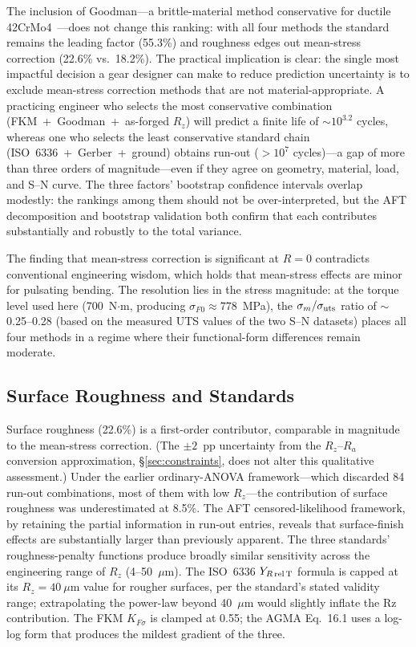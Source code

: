 \documentclass[twocolumn,12pt,a4paper]{article}
\begin{document}
The inclusion of Goodman---a brittle-material method conservative for
ductile 42CrMo4~\cite{stephens2001}---does not change this ranking:
with all four methods the standard remains the leading factor (55.3\%)
and roughness edges out mean-stress correction (22.6\% vs.\ 18.2\%).
The practical
implication is clear: the single most impactful decision a gear
designer can make
to reduce prediction uncertainty is to exclude mean-stress correction
methods that are not material-appropriate. A practicing engineer who selects the most conservative
combination
(FKM~+~Goodman~+~as-forged $R_z$) will predict a finite life of
$\sim$$10^{3.2}$ cycles, whereas one who selects the least
conservative standard chain (ISO~6336~+~Gerber~+~ground) obtains
run-out ($>10^7$ cycles)---a gap of more than three orders of
magnitude---even if they agree on geometry, material,
load, and S--N curve. The three factors' bootstrap confidence intervals
overlap modestly: the rankings among them should not be over-interpreted,
but the AFT decomposition and bootstrap validation both confirm that each
contributes substantially and robustly to the total variance.

The finding that mean-stress correction is significant at $R=0$
contradicts conventional engineering wisdom, which holds that
mean-stress effects are minor for pulsating bending. The resolution lies
in the stress magnitude: at the torque level used here (700~N$\cdot$m,
producing $\sigma_{F0} \approx 778$~MPa), the $\sigma_m/\sigma_{\rm uts}$
ratio of $\sim$0.25--0.28 (based on the measured UTS values of the two
S--N datasets) places all four methods in a regime where their
functional-form differences remain moderate.

\subsection{Surface Roughness and Standards}

Surface roughness (22.6\%) is a first-order contributor, comparable in
magnitude to the mean-stress correction. (The $\pm 2$~pp uncertainty
from the $R_z$--$R_a$ conversion approximation,
\S\ref{sec:constraints}, does not alter this qualitative assessment.)
Under the earlier ordinary-ANOVA
framework---which discarded 84 run-out combinations, most of them with
low $R_z$---the contribution of surface roughness was underestimated at
8.5\%. The AFT censored-likelihood framework, by retaining the partial
information in run-out entries, reveals that surface-finish effects are
substantially larger than previously apparent. The three standards'
roughness-penalty functions produce broadly similar sensitivity across
the engineering range of $R_z$ (4--50~$\mu$m). The ISO~6336
$Y_{R\,\rm rel\,T}$ formula is capped at its $R_z=40~\mu$m value for
rougher surfaces, per the standard's stated validity range; extrapolating
the power-law beyond 40~$\mu$m would slightly inflate the Rz contribution.
The FKM $K_{F\sigma}$ is clamped at 0.55; the AGMA Eq.~16.1 uses a
log-log form that produces the mildest gradient of the three.
\end{document}
